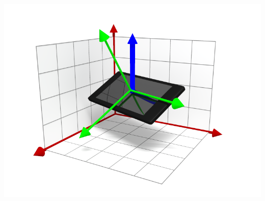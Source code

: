 \documentclass[xcolor=svgnames,english,handout]{beamer}
\begin{document}
\begin{frame}
\begin{columns}
\begin{column}{0.4\textwidth}
  \includegraphics[width=\columnwidth]{grav}
  \end{column}
  \end{columns}
\end{frame}
\end{document}
